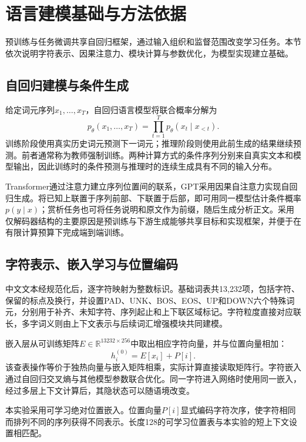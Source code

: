 \section{语言建模基础与方法依据}

预训练与任务微调共享自回归框架，通过输入组织和监督范围改变学习任务。本节依次说明字符表示、因果注意力、模块计算与参数优化，为模型实现建立基础。

\subsection{自回归建模与条件生成}

给定词元序列$x_1,\ldots,x_T$，自回归语言模型将联合概率分解为
\begin{equation}
 p_\theta(x_1,\ldots,x_T)=\prod_{t=1}^{T}p_\theta(x_t\mid x_{<t}).
 \label{eq:autoregressive}
\end{equation}
训练阶段使用真实历史词元预测下一词元；推理阶段则使用此前生成的结果继续预测。前者通常称为教师强制训练。两种计算方式的条件序列分别来自真实文本和模型输出，因此训练时的条件预测与推理时的连续生成具有不同的输入分布。

Transformer通过注意力建立序列位置间的联系\cite{transformer}，GPT采用因果自注意力实现自回归生成\cite{gpt2}。将已知上联置于序列前部、下联置于后部，即可用同一模型估计条件概率$p(y\mid x)$；赏析任务也可将任务说明和原文作为前缀，随后生成分析正文。采用仅解码器结构的主要原因是预训练与下游生成能够共享目标和实现框架，并便于在有限计算预算下完成端到端训练。

\subsection{字符表示、嵌入学习与位置编码}

中文文本经规范化后，逐字符映射为整数标识。基础词表共13,232项，包括字符、保留的标点及换行，并设置PAD、UNK、BOS、EOS、UP和DOWN六个特殊词元，分别用于补齐、未知字符、序列起止和上下联区域标记。字符粒度直接对应联长，多字词义则由上下文表示与后续词汇增强模块共同建模。

嵌入层从可训练矩阵$E\in\mathbb{R}^{13232\times256}$中取出相应字符向量，并与位置向量相加：
\begin{equation}
 h_i^{(0)}=E[x_i]+P[i].
 \label{eq:embedding}
\end{equation}
该查表操作等价于独热向量与嵌入矩阵相乘，实际计算直接读取矩阵行。字符嵌入通过自回归交叉熵与其他模型参数联合优化。同一字符进入网络时使用同一嵌入，经过多层上下文计算后，其隐状态可以随语境改变。

本实验采用可学习绝对位置嵌入。位置向量$P[i]$显式编码字符次序，使字符相同而排列不同的序列获得不同表示。长度128的可学习位置表与本实验的短上下文设置相匹配。

